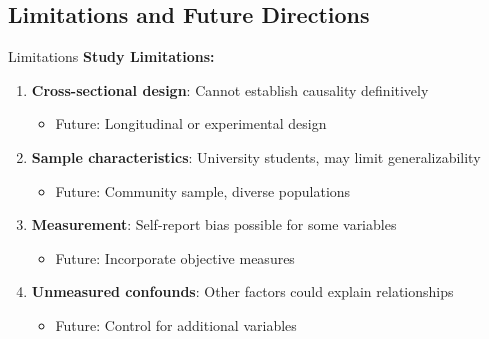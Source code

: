 \documentclass[aspectratio=169,11pt]{beamer}
\begin{document}
\subsection{Limitations and Future Directions}

\begin{frame}{Limitations}
  \textbf{Study Limitations:}
  \begin{enumerate}
    \item \textbf{Cross-sectional design}: Cannot establish causality definitively
    \begin{itemize}
      \item Future: Longitudinal or experimental design
    \end{itemize}

    \item \textbf{Sample characteristics}: University students, may limit generalizability
    \begin{itemize}
      \item Future: Community sample, diverse populations
    \end{itemize}

    \item \textbf{Measurement}: Self-report bias possible for some variables
    \begin{itemize}
      \item Future: Incorporate objective measures
    \end{itemize}

    \item \textbf{Unmeasured confounds}: Other factors could explain relationships
    \begin{itemize}
      \item Future: Control for additional variables
    \end{itemize}
  \end{enumerate}
\end{frame}
\end{document}
